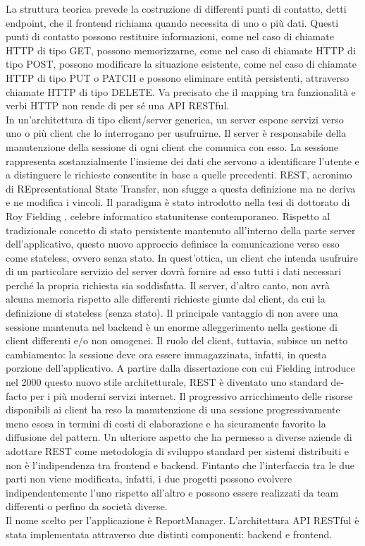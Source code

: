 La struttura teorica prevede la costruzione di differenti punti di contatto, detti endpoint, che il frontend richiama quando necessita di uno o più dati.
Questi punti di contatto possono restituire informazioni, come nel caso di chiamate HTTP di tipo GET, possono memorizzarne, come nel caso di chiamate HTTP di tipo POST, possono modificare
la situazione esistente, come nel caso di chiamate HTTP di tipo PUT o PATCH e possono eliminare entità persistenti, attraverso chiamate HTTP di tipo DELETE.
Va precisato che il mapping tra funzionalità e verbi HTTP non rende di per sé una API RESTful.
\\
In un'architettura di tipo client/server generica, un server espone servizi verso uno o più client che lo interrogano per usufruirne.
Il server è responsabile della manutenzione della sessione di ogni client che comunica con esso.
La sessione rappresenta sostanzialmente l'insieme dei dati che servono a identificare l'utente e a distinguere le richieste consentite in base a quelle precedenti.
REST, acronimo di REpresentational State Transfer, non sfugge a questa definizione ma ne deriva e ne modifica i vincoli.
Il paradigma è stato introdotto nella tesi di dottorato di Roy Fielding \cite{fielding2000architectural}, celebre informatico statunitense contemporaneo.
Rispetto al tradizionale concetto di stato persistente mantenuto all'interno della parte server dell'applicativo, questo nuovo approccio definisce la comunicazione verso esso come stateless, ovvero senza stato.
In quest'ottica, un client che intenda usufruire di un particolare servizio del server dovrà fornire ad esso tutti i dati necessari perché la propria richiesta sia soddisfatta.
Il server, d'altro canto, non avrà alcuna memoria rispetto alle differenti richieste giunte dal client, da cui la definizione di stateless (senza stato).
Il principale vantaggio di non avere una sessione mantenuta nel backend è un enorme alleggerimento nella gestione di client differenti e/o non omogenei.
Il ruolo del client, tuttavia, subisce un netto cambiamento: la sessione deve ora essere immagazzinata, infatti, in questa porzione dell'applicativo.
A partire dalla dissertazione con cui Fielding introduce nel 2000 questo nuovo stile architetturale, REST è diventato uno standard de-facto per i più moderni servizi internet.
Il progressivo arricchimento delle risorse disponibili ai client ha reso la manutenzione di una sessione progressivamente meno esosa in termini di costi di elaborazione e ha sicuramente favorito la diffusione del pattern.
Un ulteriore aspetto che ha permesso a diverse aziende di adottare REST come metodologia di sviluppo standard per sistemi distribuiti e non è l'indipendenza tra frontend e backend.
Fintanto che l'interfaccia tra le due parti non viene modificata, infatti, i due progetti possono evolvere indipendentemente l'uno rispetto all'altro e possono essere realizzati da team differenti o perfino da società diverse.
\\
Il nome scelto per l'applicazione è ReportManager.
L'architettura API RESTful è stata implementata attraverso due distinti componenti: backend e frontend.

